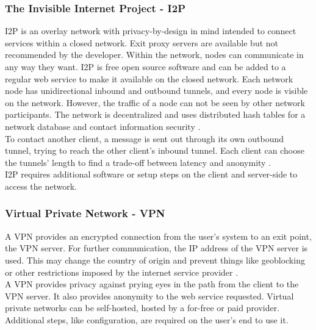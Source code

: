     \subsubsection{The Invisible Internet Project - I2P}
        I2P is an overlay network with privacy-by-design in mind intended to connect services within a closed network.
        Exit proxy servers are available but not recommended by the developer. Within the network, nodes can communicate in any way they want. I2P is free open source software and can be added to a regular web service to make it available on the closed network. Each network node has unidirectional inbound and outbound tunnels, and every node is visible on the network. However, the traffic of a node can not be seen by other network participants. The network is decentralized and uses distributed hash tables for a network database and contact information security \cite{i2p_intro_2014}.\\
        To contact another client, a message is sent out through its own outbound tunnel, trying to reach the other client's inbound tunnel. Each client can choose the tunnels' length to find a trade-off between latency and anonymity \cite{anoncoin_i2p_2018}.\\
        I2P requires additional software or setup steps on the client and server-side to access the network.\\
        
        
        
    
    \subsubsection{Virtual Private Network - VPN}
        A VPN provides an encrypted connection from the user's system to an exit point, the VPN server. For further communication, the IP address of the VPN server is used. This may change the country of origin and prevent things like geoblocking or other restrictions imposed by the internet service provider \cite{microsoft_virtual_2009}.\\
        A VPN provides privacy against prying eyes in the path from the client to the VPN server. It also provides anonymity to the web service requested. Virtual private networks can be self-hosted, hosted by a for-free or paid provider. Additional steps, like configuration, are required on the user's end to use it.\\

    

